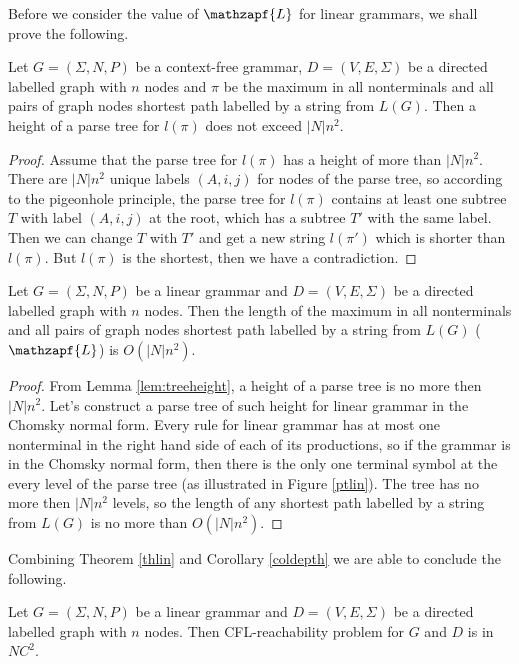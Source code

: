 Before we consider the value of $\mathzapf{L}$ for linear grammars, we shall prove the following.
\begin{lemma}
\label{lem:treeheight}
Let  $G = (\Sigma, N, P)$ be a context-free grammar,  $D=(V, E, \Sigma)$ be a directed labelled graph with $n$ nodes and $\pi$ be the maximum in all nonterminals and all pairs of graph nodes shortest path labelled by a string from $L(G)$. Then a height of a parse tree for $l(\pi)$ does not exceed $|N|n^2$.
\end{lemma}

\begin{proof}
 Assume that the parse tree for $l(\pi)$ has a height of more than $|N|n^2$. There are $|N|n^2$ unique labels $(A, i, j)$ for nodes of the parse tree, so according to the pigeonhole principle, the parse tree for $l(\pi)$ contains at least one subtree $T$ with label $(A, i, j)$ at the root, which has a subtree $T'$ with the same label. Then we can change $T$ with $T'$ and get a new string $l(\pi')$ which is shorter than $l(\pi)$. But $l(\pi)$ is the shortest, then we have a contradiction.

\end{proof}
\begin{theorem}
\label{thlin}
Let  $G = (\Sigma, N, P)$ be a linear grammar and $D=(V, E, \Sigma)$ be a directed labelled graph with $n$ nodes. Then the length of the maximum in all nonterminals and all pairs of graph nodes shortest path labelled by a string from $L(G)$ ($\mathzapf{L}$) is $O(|N|n^2)$.
\end{theorem}

\begin{proof}
From Lemma \ref{lem:treeheight}, a height of a parse tree is no more then $|N|n^2$. Let's construct a parse tree of such height for linear grammar in the Chomsky normal form. Every rule for linear grammar has at most one nonterminal in the right hand side of each of its productions, so if the grammar is in the Chomsky normal form, then there is the only one terminal symbol at the every level of the parse tree (as illustrated in Figure \ref{ptlin}). The tree has no more then $|N|n^2$ levels, so the length of any shortest path labelled by a string from $L(G)$ is no more than $O(|N|n^2)$.
\end{proof}
Combining Theorem \ref{thlin} and Corollary \ref{coldepth} we are able to conclude the following.
\begin{corollary} 
Let  $G = (\Sigma, N, P)$ be a linear grammar and $D=(V, E, \Sigma)$ be a directed labelled graph with $n$ nodes. Then CFL-reachability problem for $G$ and $D$ is in $NC^2$.
\end{corollary}

